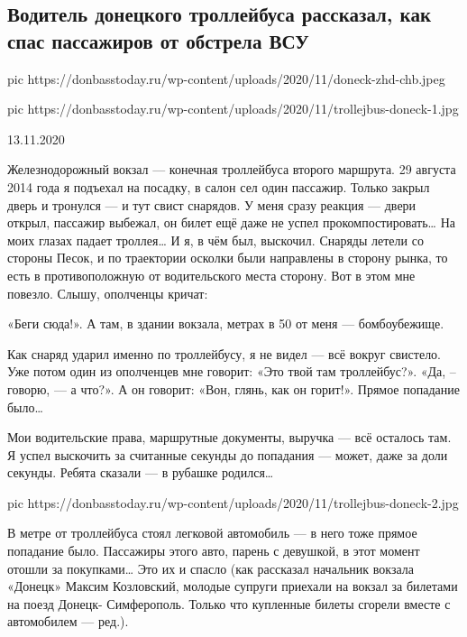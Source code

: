  
 
 

\subsection{Водитель донецкого троллейбуса рассказал, как спас пассажиров от обстрела ВСУ}
\label{sec:13_11_2020.news.dnr.donbass_today.1.trolleybus}

\ifcmt
pic https://donbasstoday.ru/wp-content/uploads/2020/11/doneck-zhd-chb.jpeg

pic https://donbasstoday.ru/wp-content/uploads/2020/11/trollejbus-doneck-1.jpg
\fi

13.11.2020

Железнодорожный вокзал --- конечная троллейбуса второго маршрута. 29 августа
2014 года я подъехал на посадку, в салон сел один пассажир. Только закрыл
дверь и тронулся --- и тут свист снарядов. У меня сразу реакция --- двери
открыл, пассажир выбежал, он билет ещё даже не успел прокомпостировать… На
моих глазах падает троллея… И я, в чём был, выскочил. Снаряды летели со
стороны Песок, и по траектории осколки были направлены в сторону рынка, то
есть в противоположную от водительского места сторону. Вот в этом мне
повезло. Слышу, ополченцы кричат:

«Беги сюда!». А там, в здании вокзала, метрах в 50 от меня --- бомбоубежище.

Как снаряд ударил именно по троллейбусу, я не видел --- всё вокруг свистело.
Уже потом один из ополченцев мне говорит: «Это твой там троллейбус?». «Да,
– говорю, --- а что?». А он говорит: «Вон, глянь, как он горит!». Прямое
попадание было…

Мои водительские права, маршрутные документы, выручка --- всё осталось там.
Я успел выскочить за считанные секунды до попадания --- может, даже за доли
секунды. Ребята сказали --- в рубашке родился…

\ifcmt
pic https://donbasstoday.ru/wp-content/uploads/2020/11/trollejbus-doneck-2.jpg
\fi

В метре от троллейбуса стоял легковой автомобиль --- в него тоже прямое
попадание было. Пассажиры этого авто, парень с девушкой, в этот момент
отошли за покупками… Это их и спасло (как рассказал начальник вокзала
«Донецк» Максим Козловский, молодые супруги приехали на вокзал за билетами
на поезд Донецк- Симферополь. Только что купленные билеты сгорели вместе с
автомобилем --- ред.).

